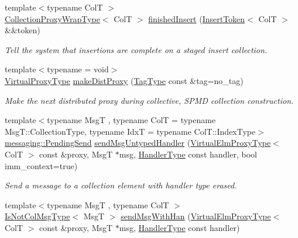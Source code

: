 \begin{DoxyCompactItemize}
{\footnotesize template$<$typename ColT $>$ }\\\hyperlink{structvt_1_1vrt_1_1collection_1_1_collection_manager_a56458ed7f9bb22b631b9b3a745f42f94}{Collection\+Proxy\+Wrap\+Type}$<$ ColT $>$ \hyperlink{structvt_1_1vrt_1_1collection_1_1_collection_manager_a9275a4f6a7c33389813ba7fe4cc75d7e}{finished\+Insert} (\hyperlink{structvt_1_1vrt_1_1collection_1_1_insert_token}{Insert\+Token}$<$ ColT $>$ \&\&token)
\begin{DoxyCompactList}\small\item\em Tell the system that insertions are complete on a staged insert collection. \end{DoxyCompactList}\item 
{\footnotesize template$<$typename  = void$>$ }\\\hyperlink{namespacevt_a1b417dd5d684f045bb58a0ede70045ac}{Virtual\+Proxy\+Type} \hyperlink{structvt_1_1vrt_1_1collection_1_1_collection_manager_a1f18abc7b511cce4d07ba011c91d21df}{make\+Dist\+Proxy} (\hyperlink{namespacevt_a84ab281dae04a52a4b243d6bf62d0e52}{Tag\+Type} const \&tag=no\+\_\+tag)
\begin{DoxyCompactList}\small\item\em Make the next distributed proxy during collective, S\+P\+MD collection construction. \end{DoxyCompactList}\item 
{\footnotesize template$<$typename MsgT , typename ColT  = typename Msg\+T\+::\+Collection\+Type, typename IdxT  = typename Col\+T\+::\+Index\+Type$>$ }\\\hyperlink{structvt_1_1messaging_1_1_pending_send}{messaging\+::\+Pending\+Send} \hyperlink{structvt_1_1vrt_1_1collection_1_1_collection_manager_a6411b315ab0a4bfa0293db456077d5cc}{send\+Msg\+Untyped\+Handler} (\hyperlink{namespacevt_1_1vrt_a620a5c8c59d13e513f690c74b4af516f}{Virtual\+Elm\+Proxy\+Type}$<$ ColT $>$ const \&proxy, MsgT $\ast$msg, \hyperlink{namespacevt_af64846b57dfcaf104da3ef6967917573}{Handler\+Type} const handler, bool imm\+\_\+context=true)
\begin{DoxyCompactList}\small\item\em Send a message to a collection element with handler type erased. \end{DoxyCompactList}\item 
{\footnotesize template$<$typename MsgT , typename ColT $>$ }\\\hyperlink{structvt_1_1vrt_1_1collection_1_1_collection_manager_ae376deeefd4f89a0b1c93849977715d9}{Is\+Not\+Col\+Msg\+Type}$<$ MsgT $>$ \hyperlink{structvt_1_1vrt_1_1collection_1_1_collection_manager_ae3ae6f30c8b4aa2c8b50494127cbd77b}{send\+Msg\+With\+Han} (\hyperlink{namespacevt_1_1vrt_a620a5c8c59d13e513f690c74b4af516f}{Virtual\+Elm\+Proxy\+Type}$<$ ColT $>$ const \&proxy, MsgT $\ast$msg, \hyperlink{namespacevt_af64846b57dfcaf104da3ef6967917573}{Handler\+Type} const handler)

\end{DoxyCompactItemize}
